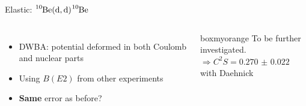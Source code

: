 \documentclass[sans,
frameno, %
mp,
usenames,dvipsnames, %
onlytextwidth, %
t,%
11pt]{beamer}
\newcommand{\notice}[1]{\textbf{\alert{#1}}}
\newcommand{\iso}[2]{\ce{^{#1}#2}}
\begin{document}
\begin{frame}{Elastic: $\iso{10}{Be}(\textrm{d}, \textrm{d})\iso{10}{Be}$}
{\begin{figure}
\begin{minipage}[t]{0.48\linewidth}
            \end{minipage}
        \end{figure}
        \begin{columns}
            {
                \begin{itemize}
                    \item DWBA: potential deformed in both Coulomb and nuclear parts
                    \item Using $B(E2)$ from other experiments
                    \item \notice{Same} error as before?
                \end{itemize}
            }\hfill
            {

                \begin{beamercolorbox}[sep=1ex, center, rounded=true]{boxmyorange}
                    To be further investigated. \\
                    $\Rightarrow C^2S = \qty{0.270(22)}{}$ with Daehnick
                \end{beamercolorbox}

            }
        \end{columns}
    }
\end{frame}
\end{document}
